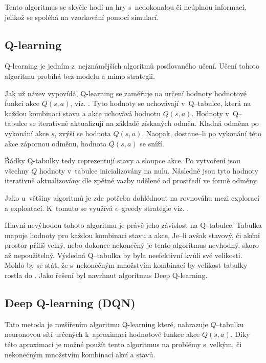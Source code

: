 Tento algoritmus se skvěle hodí na hry s~nedokonalou či neúplnou informací, jelikož se spoléhá na vzorkování pomocí simulací.

\subsection{Q-learning}\label{subsec:q-learning}

Q-learning je jedním z~nejznámějších algoritmů posilovaného učení.
Učení tohoto algoritmu probíhá bez modelu a mimo strategii.

Jak už název vypovídá, Q-learning se zaměřuje na určení hodnoty hodnotové funkci akce $Q(s, a)$, viz. .
Tyto hodnoty se uchovávají v~Q--tabulce, která na každou kombinaci stavu a akce uchovává hodnotu $Q(s, a)$.
Hodnoty v~Q--tabulce se iterativně aktualizují na základě získaných odměn.
Kladná odměna po vykonání akce $s$, zvýší se hodnota $Q(s, a)$.
Naopak, dostane--li po vykonání této akce zápornou odměnu, hodnota $Q(s, a)$ se sníží.

Řádky Q-tabulky tedy reprezentují stavy a sloupce akce.
Po vytvoření jsou všechny $Q$ hodnoty v~tabulce inicializovány na nulu.
Následně jsou tyto hodnoty iterativně aktualizovány dle zpětné vazby udělené od prostředí ve formě odměny.

Jako u~většiny algoritmů je zde potřeba dohlédnout na rovnováhu mezi explorací a exploatací.
K~tomuto se využívá $\epsilon$--greedy strategie viz. .

Hlavní nevýhodou tohoto algoritmu je právě jeho závislost na Q--tabulce.
Tabulka mapuje hodnoty pro každou kombinaci stavu a akce,
Je--li avšak stavový, či akční prostor příliš velký, nebo dokonce nekonečný je tento algoritmus nevhodný, skoro až nepoužitelný.
Výsledná Q--tabulka by byla neefektivní kvůli své velikosti.
Mohlo by se stát, že s~nekonečným množstvím kombinací by velikost tabulky rostla do .
Jako řešení byl navrhnut algoritmus Deep Q-learning.

\subsection{Deep Q-learning (DQN)}\label{subsec:deep-q-learning}

Tato metoda je rozšířením algoritmu Q-learning které,
nahrazuje $Q$--tabulku neuronovou sítí určených k~aproximaci hodnotové funkce akce $Q(s, a)$.
Díky této aproximaci je možné použít tento algoritmus na problémy s~velkým, či nekonečným množstvím kombinací akcí a stavů.


